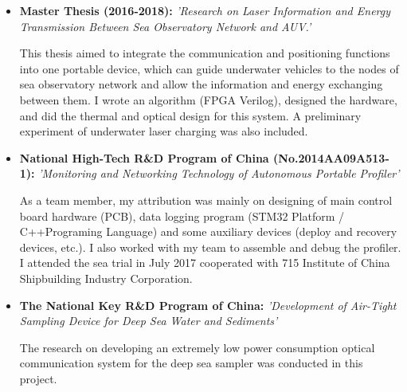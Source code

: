 \documentclass[11pt,a4paper,sans]{moderncv}         %
\begin{document}
    \vspace{3pt}

    \begin{itemize}

    \vspace{5pt}

    \item{\textbf{Master Thesis (2016-2018): }\textit{'Research on Laser Information and Energy Transmission Between Sea Observatory Network and AUV.'}

    \vspace{3pt}

    \small{This thesis aimed to integrate the communication and positioning functions into one portable device, which can guide underwater vehicles to the nodes of sea observatory network and allow the information and energy exchanging between them. I wrote an algorithm (FPGA Verilog), designed the hardware, and did the thermal and optical design for this system. A preliminary experiment of underwater laser charging was also included.}}

    \vspace{6pt}

    \item{\textbf{National High-Tech R\&D Program of China (No.2014AA09A513-1): }\textit{'Monitoring and Networking Technology of Autonomous Portable Profiler'}

    \vspace{3pt}

    \small{As a team member, my attribution was mainly on designing of main control board hardware (PCB), data logging program (STM32 Platform / C++Programing Language) and some auxiliary devices (deploy and recovery devices, etc.). I also worked with my team to assemble and debug the profiler. I attended the sea trial in July 2017 cooperated with 715 Institute of China Shipbuilding Industry Corporation.}}

    \vspace{6pt}

    \item{\textbf{The National Key R\&D Program of China: }\textit{'Development of Air-Tight Sampling Device for Deep Sea Water and Sediments'}

    \vspace{3pt}

    \small{The research on developing an extremely low power consumption optical communication system for the deep sea sampler was conducted in this project.}}


\end{itemize}
\end{document}
